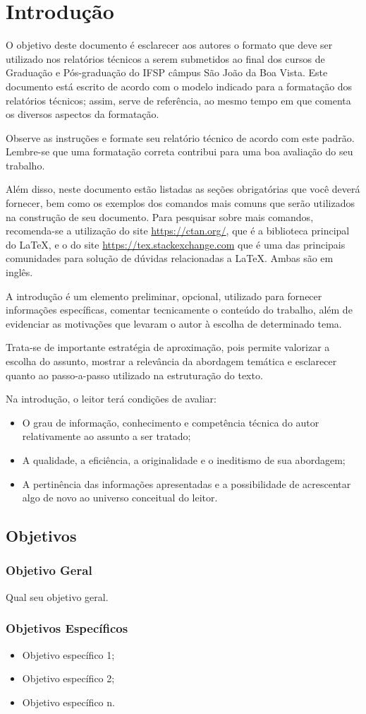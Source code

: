 \chapter{Introdução}
\label{cap:01}

O objetivo deste documento é esclarecer aos autores o formato que deve ser utilizado nos relatórios técnicos a serem submetidos ao final dos cursos de Graduação e Pós-graduação do IFSP câmpus São João da Boa Vista. Este documento está escrito de acordo com o modelo indicado para a formatação dos relatórios técnicos; assim, serve de referência, ao mesmo tempo em que comenta os diversos aspectos da formatação.

Observe as instruções e formate seu relatório técnico de acordo com este padrão. Lembre-se que uma formatação correta contribui para uma boa avaliação do seu trabalho.

Além disso, neste documento estão listadas as seções obrigatórias que você deverá fornecer, bem como os exemplos dos comandos mais comuns que serão utilizados na construção de seu documento. Para pesquisar sobre mais comandos, recomenda-se a utilização do site \url{https://ctan.org/}, que é a biblioteca principal do \LaTeX, e o do site \url{https://tex.stackexchange.com} que é uma das principais comunidades para solução de dúvidas relacionadas a \LaTeX. Ambas são em inglês.

A introdução é um elemento preliminar, opcional, utilizado para fornecer informações específicas, comentar tecnicamente o conteúdo do trabalho, além de evidenciar as motivações que levaram o autor à escolha de determinado tema.

Trata-se de importante estratégia de aproximação, pois permite valorizar a escolha do assunto, mostrar a relevância da abordagem temática e esclarecer quanto ao passo-a-passo utilizado na estruturação do texto.

Na introdução, o leitor terá condições de avaliar:

\begin{itemize}
	\item O grau de informação, conhecimento e competência técnica do autor relativamente ao assunto a ser tratado;
	\item A qualidade, a eficiência, a originalidade e o ineditismo de sua abordagem;
	\item A pertinência das informações apresentadas e a possibilidade de acrescentar algo de novo ao universo conceitual do leitor.
\end{itemize}


\section{Objetivos}

\subsection{Objetivo Geral}

Qual seu objetivo geral.

\subsection{Objetivos Específicos}
\begin{itemize}
	\item Objetivo específico 1;
	\item Objetivo específico 2;
	\item Objetivo específico n.
\end{itemize}